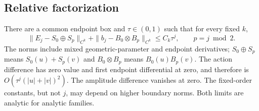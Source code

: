 \subsection{Relative factorization}
\begin{theorem}
\label{thm:v4-factorization}
There are a common endpoint box and $\tau\in(0,1)$ such that for every
fixed $k$,
\begin{equation}\label{eq:v4-factorization}
 \|E_j-S_0\oplus S_p\|_{C^k}
 +\|b_j-B_0\otimes B_p\|_{C^k}\le C_k\tau^j,
 \qquad p=j\bmod2.
\end{equation}
The norms include mixed geometric-parameter and endpoint derivatives;
$S_0\oplus S_p$ means $S_0(u)+S_p(v)$ and
$B_0\otimes B_p$ means $B_0(u)B_p(v)$. The action difference has
zero value and first endpoint differential at zero, and therefore is
$O(\tau^j(|u|+|v|)^2)$. The amplitude difference vanishes at zero.
The fixed-order constants, but not $j$, may depend on higher boundary
norms. Both limits are analytic for analytic families.
\end{theorem}
